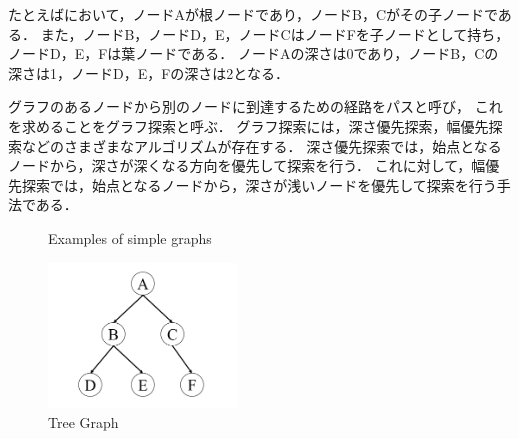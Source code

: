 たとえばにおいて，ノードAが根ノードであり，ノードB，Cがその子ノードである．
また，ノードB，ノードD，E，ノードCはノードFを子ノードとして持ち，ノードD，E，Fは葉ノードである．
ノードAの深さは0であり，ノードB，Cの深さは1，ノードD，E，Fの深さは2となる．

グラフのあるノードから別のノードに到達するための経路をパスと呼び，
これを求めることをグラフ探索と呼ぶ．
グラフ探索には，深さ優先探索，幅優先探索などのさまざまなアルゴリズムが存在する．
深さ優先探索では，始点となるノードから，深さが深くなる方向を優先して探索を行う．
これに対して，幅優先探索では，始点となるノードから，深さが浅いノードを優先して探索を行う手法である．

\begin{figure}[htbp]
  \hspace{0.02\columnwidth}
  \caption{Examples of simple graphs}
  \label{fig:example_simple_graphs}  %
\end{figure}

\begin{figure}[htbp]
  \begin{center}
    \includegraphics[width=50mm, clip]{figure/chapter2/tree_graph.png}
    \caption{Tree Graph}
    \label{fig:tree_graph} %
  \end{center}
\end{figure}

